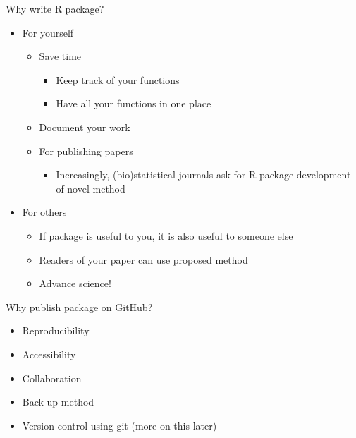 \documentclass[
  ignorenonframetext,
]{beamer}
\providecommand{\tightlist}{%
  \setlength{\itemsep}{0pt}\setlength{\parskip}{0pt}}
\begin{document}
\begin{frame}{Why write R package?}
\protect\hypertarget{why-write-r-package}{}

\begin{itemize}
\tightlist
\item
  For yourself

  \begin{itemize}
  \tightlist
  \item
    Save time

    \begin{itemize}
    \tightlist
    \item
      Keep track of your functions
    \item
      Have all your functions in one place
    \end{itemize}
  \item
    Document your work
  \item
    For publishing papers

    \begin{itemize}
    \tightlist
    \item
      Increasingly, (bio)statistical journals ask for R package
      development of novel method
    \end{itemize}
  \end{itemize}
\item
  For others

  \begin{itemize}
  \tightlist
  \item
    If package is useful to you, it is also useful to someone else
  \item
    Readers of your paper can use proposed method
  \item
    Advance science!
  \end{itemize}
\end{itemize}

\end{frame}

\begin{frame}{Why publish package on GitHub?}
\protect\hypertarget{why-publish-package-on-github}{}

\begin{itemize}
\tightlist
\item
  Reproducibility
\item
  Accessibility
\item
  Collaboration
\item
  Back-up method
\item
  Version-control using \alert{git} (more on this later)
\end{itemize}

\end{frame}
\end{document}
